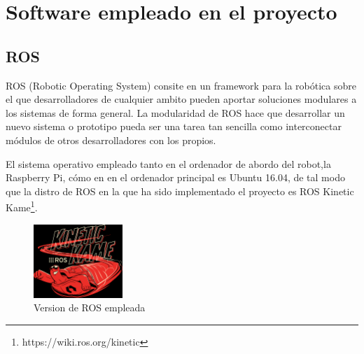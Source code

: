 \section{Software empleado en el proyecto}
\subsection{ROS}
ROS (Robotic Operating System) consite en un framework para la robótica sobre el que desarrolladores de cualquier 
ambito pueden aportar soluciones modulares a los sistemas de forma general. La modularidad de ROS hace que desarrollar 
un nuevo sistema o prototipo pueda ser una tarea tan sencilla como interconectar módulos de otros desarrolladores con 
los propios.

El sistema operativo empleado tanto en el ordenador de abordo del robot,la Raspberry Pi, cómo en en el ordenador principal es Ubuntu 16.04, de tal modo que la distro de ROS en la que ha sido 
implementado el proyecto es ROS Kinetic Kame\footnote{https://wiki.ros.org/kinetic}.
\begin{figure}[!ht]
    \centering
    \includegraphics[width=0.3\textwidth]{images/kinetic.png}
    \caption{Version de ROS empleada}
\end{figure}

